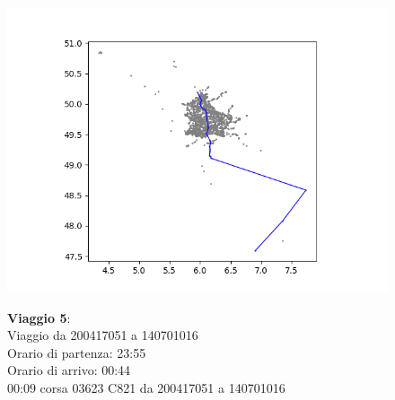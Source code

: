 \documentclass{article}
\begin{document}
\begin{figure}[H]
	\begin{minipage}{0.55\linewidth}
		\centering
		\hspace*{-6cm}\includegraphics[width=1.0\linewidth, valign=t]{figures/Figure_1}
	\end{minipage}
	\hspace*{-4cm}\begin{minipage}{0.7\linewidth}
		\textbf{Viaggio 5}:\\
		Viaggio da 200417051 a 140701016\\
		Orario di partenza: 23:55\\
		Orario di arrivo: 00:44\\
		00:09 corsa 03623 C821 da 200417051 a 140701016
		
	\end{minipage}
\end{figure}
\end{document}
